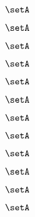 {\begin{forslides}
        \begin{equation}
            \label{eq:combination-176}
            \setA
        \end{equation}

        \begin{equation}
            \label{eq:combination-177}
            \setA
        \end{equation}

        \begin{equation}
            \label{eq:combination-178}
            \setA
        \end{equation}

        \begin{equation}
            \label{eq:combination-179}
            \setA
        \end{equation}

        \begin{equation}
            \label{eq:combination-180}
            \setA
        \end{equation}

        \begin{equation}
            \label{eq:combination-181}
            \setA
        \end{equation}

        \begin{equation}
            \label{eq:combination-182}
            \setA
        \end{equation}

        \begin{equation}
            \label{eq:combination-183}
            \setA
        \end{equation}

        \begin{equation}
            \label{eq:combination-184}
            \setA
        \end{equation}

        \begin{equation}
            \label{eq:combination-185}
            \setA
        \end{equation}

        \begin{equation}
            \label{eq:combination-186}
            \setA
        \end{equation}

        \begin{equation}
            \label{eq:combination-187}
            \setA
        \end{equation}


\end{forslides}}
